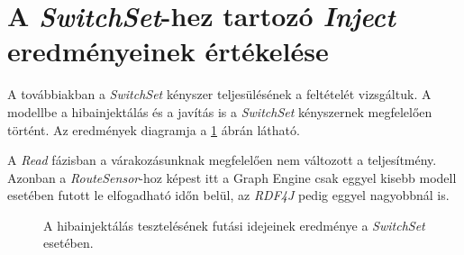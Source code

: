 \section{A \emph{SwitchSet}-hez tartozó \emph{Inject} eredményeinek értékelése}

A továbbiakban a \emph{SwitchSet} kényszer teljesülésének a feltételét vizsgáltuk. A modellbe a hibainjektálás és a javítás is a \emph{SwitchSet} kényszernek megfelelően történt. Az eredmények diagramja a \ref{fig:SwitchSetInjectResult} ábrán látható.

A \emph{Read} fázisban a várakozásunknak megfelelően nem változott a teljesítmény. Azonban a \emph{RouteSensor}-hoz képest itt a Graph Engine csak eggyel kisebb modell esetében futott le elfogadható időn belül, az \emph{RDF4J} pedig eggyel nagyobbnál is.

\pagebreak
\begin{figure}[H]
	\centering
	\vspace*{-2cm}
	\caption{A hibainjektálás tesztelésének futási idejeinek eredménye a \emph{SwitchSet} esetében.}
	\label{fig:SwitchSetInjectResult}
\end{figure}

